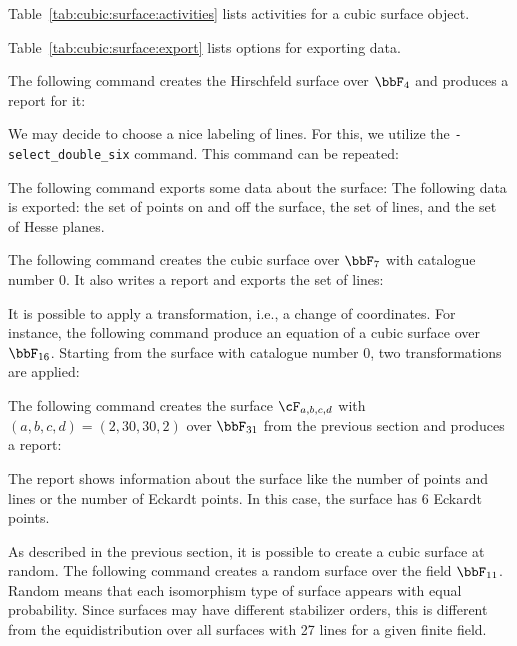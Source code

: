 Table~\ref{tab:cubic:surface:activities} lists activities for a cubic surface object.

Table~\ref{tab:cubic:surface:export} lists options for exporting data.

\bigskip


The following command creates the Hirschfeld surface over $\bbF_4$ 
and produces a report for it:

\bigskip


We may decide to choose a nice labeling of lines. 
For this, we utilize the \verb'-select_double_six' command. 
This command can be repeated:

\bigskip


The following command exports some data about the surface:
The following data is exported: the set of points on and off the surface, 
the set of lines, and the set of Hesse planes.


\bigskip

The following command creates the cubic surface over $\bbF_7$ 
with catalogue number 0. It also writes a report 
and exports the set of lines:



\bigskip

It is possible to apply a transformation, i.e., a change of coordinates.
For instance, the following command produce 
an equation of a cubic surface over $\bbF_{16}$.
Starting from the surface with catalogue number 0, 
two transformations are applied:




\bigskip




The following command creates the surface $\cF_{a,b,c,d}$ 
with $(a,b,c,d)=(2,30,30,2)$ over $\bbF_{31}$ 
from the previous section and produces a report:


The report shows information about the surface like the number of points and lines 
or the number of Eckardt points. 
In this case, the surface has 6 Eckardt points. 


\bigskip


As described in the previous section, 
it is possible to create a cubic surface at random. 
The following command creates a random surface over the field $\bbF_{11}$. 
Random means that each isomorphism type 
of surface appears with equal probability. 
Since surfaces may have different stabilizer orders, 
this is different from 
the equidistribution over all surfaces 
with 27 lines for a given finite field.

